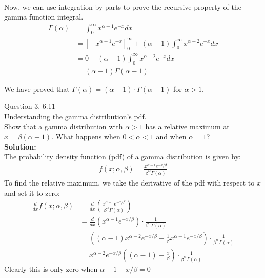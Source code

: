 \documentclass[answers,12pt,addpoints]{exam}
\begin{document}
\begin{questions}
\begin{align*}
\end{align*}
Now, we can use integration by parts to prove the recursive property of the gamma function integral.
\begin{align*}
    \Gamma(\alpha) &= \int_0^\infty x^{\alpha - 1}e^{-x}dx\\
    &= \left[-x^{\alpha - 1}e^{-x}\right]_0^\infty + (\alpha - 1)\int_0^\infty x^{\alpha - 2}e^{-x}dx\\
    &= 0 + (\alpha - 1)\int_0^\infty x^{\alpha - 2}e^{-x}dx\\
    &= (\alpha - 1)\Gamma(\alpha - 1)
\end{align*}
\begin{solution}
    We have proved that \(\Gamma(\alpha) = (\alpha - 1) \cdot \Gamma(\alpha - 1)\) for \(\alpha > 1\).
\end{solution}
    \question Question 3. 6.11\\
        Understanding the gamma distribution's pdf.\\
        Show that a gamma distribution with $\alpha > 1$ has a relative maximum at $x = \beta(\alpha - 1)$. What happens when
    $0 < \alpha < 1$ and when $\alpha = 1$?\\
    \textbf{Solution:}\\
    The probability density function (pdf) of a gamma distribution is given by:
    \begin{align*}
        f(x; \alpha, \beta) = \frac{ x^{\alpha-1} e^{-x/\beta}}{\beta^\alpha \Gamma(\alpha)}
    \end{align*}
    To find the relative maximum, we take the derivative of the pdf with respect to $x$ and set it to zero:
    \begin{align*}
        \frac{d}{dx} f(x; \alpha, \beta) &= \frac{d}{dx} \left( \frac{x^{\alpha-1} e^{-x/\beta}}{\beta^\alpha \Gamma(\alpha)} \right) \\
        &= \frac{d}{dx} \left( x^{\alpha-1} e^{- x/\beta} \right) \cdot \frac{1}{\beta^\alpha \Gamma(\alpha)} \\
        &= \left( (\alpha - 1)x^{\alpha-2} e^{- x/\beta} - \frac{1}{\beta} x^{\alpha-1} e^{- x/\beta} \right) \cdot \frac{1}{\beta^\alpha \Gamma(\alpha)} \\
        &= x^{\alpha-2} e^{- x/\beta} \left( (\alpha - 1) -  \frac{x}{\beta} \right) \cdot \frac{1}{\beta^\alpha \Gamma(\alpha)} 
    \end{align*}
    Clearly this is only zero when $\alpha -1 - x/\beta = 0$ \\
    \begin{solution}

\end{solution}
\end{questions}
\end{document}
